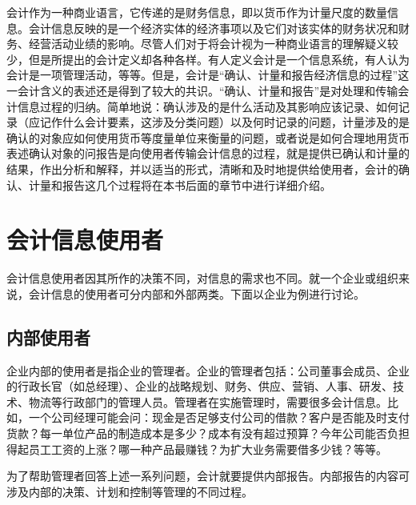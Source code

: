 	会计作为一种商业语言，它传递的是财务信息，即以货币作为计量尺度的数量信息。会计信息反映的是一个经济实体的经济事项以及它们对该实体的财务状况和财务、经营活动业绩的影响。尽管人们对于将会计视为一种商业语言的理解疑义较少，但是所提出的会计定义却各种各样。有人定义会计是一个信息系统，有人认为会计是一项管理活动，等等。但是，会计是“确认、计量和报告经济信息的过程”这一会计含义的表述还是得到了较大的共识。“确认、计量和报告”是对处理和传输会计信息过程的归纳。简单地说：确认涉及的是什么活动及其影响应该记录、如何记录（应记作什么会计要素，这涉及分类问题）以及何时记录的问题，计量涉及的是确认的对象应如何使用货币等度量单位来衡量的问题，或者说是如何合理地用货币表述确认对象的问报告是向使用者传输会计信息的过程，就是提供已确认和计量的结果，作出分析和解释，并以适当的形式，清晰和及时地提供给使用者，会计的确认、计量和报告这几个过程将在本书后面的章节中进行详细介绍。

	\section{会计信息使用者}

	会计信息使用者因其所作的决策不同，对信息的需求也不同。就一个企业或组织来说，会计信息的使用者可分内部和外部两类。下面以企业为例进行讨论。

		\subsection{内部使用者}
		
		企业内部的使用者是指企业的管理者。企业的管理者包括：公司董事会成员、企业的行政长官（如总经理）、企业的战略规划、财务、供应、营销、人事、研发、技术、物流等行政部门的管理人员。管理者在实施管理时，需要很多会计信息。比如，一个公司经理可能会问：现金是否足够支付公司的借款？客户是否能及时支付货款？每一单位产品的制造成本是多少？成本有没有超过预算？今年公司能否负担得起员工工资的上涨？哪一种产品最赚钱？为扩大业务需要借多少钱？等等。
		
		为了帮助管理者回答上述一系列问题，会计就要提供内部报告。内部报告的内容可涉及内部的决策、计划和控制等管理的不同过程。

